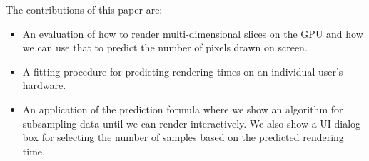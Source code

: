 The contributions of this paper are:

\begin{itemize}

\item An evaluation of how to render multi-dimensional slices on the GPU 
      and how we can use that to predict the number of pixels drawn on screen.

\item A fitting procedure for predicting rendering times on an
 individual user's hardware.

\item An application of the prediction formula where we show an algorithm
	  for subsampling data until we can render interactively.  We also 
	  show a UI dialog box for selecting the number of samples based on
	  the predicted rendering time.


\end{itemize}

